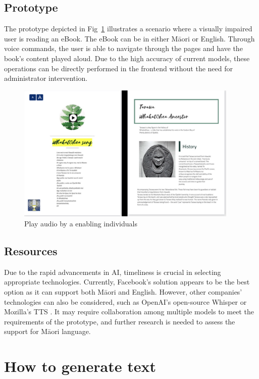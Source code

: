 \subsection{Prototype}

The prototype depicted in Fig~\ref{s-2} illustrates a scenario where a visually impaired user is reading an eBook. 
The eBook can be in either Māori or English. 
Through voice commands, the user is able to navigate through the pages and have the book's content played aloud. 
Due to the high accuracy of current models, these operations can be directly performed in the frontend without the need for administrator intervention.

\begin{figure}[htbp]
  \centerline{\includegraphics[width=300pt]{images/s-2.png}}
  \caption{Play audio by a enabling individuals}
  \label{s-2}
\end{figure}

\subsection{Resources}

Due to the rapid advancements in AI, timeliness is crucial in selecting appropriate technologies. 
Currently, Facebook's solution appears to be the best option as it can support both Māori and English. 
However, other companies' technologies can also be considered, such as OpenAI's open-source Whisper \autocite{Introduc57:online} or Mozilla's TTS \autocite{mozillaT63:online}. 
It may require collaboration among multiple models to meet the requirements of the prototype, and further research is needed to assess the support for Māori language.

\section{How to generate text}


